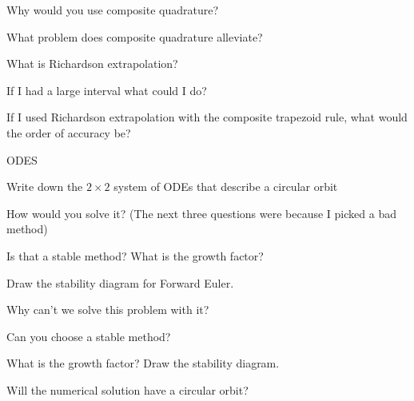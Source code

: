 \documentclass[12pt]{article}
\newenvironment{problem}[2][Problem]{\begin{trivlist}
\item[\hskip \labelsep {\bfseries #1}\hskip \labelsep {\bfseries #2.}]}{\end{trivlist}}
\begin{document}
\begin{problem}{}
Why would you use composite quadrature?
\end{problem}

\begin{problem}{}
What problem does composite quadrature alleviate?
\end{problem}

\begin{problem}{}
What is Richardson extrapolation?
\end{problem}

\begin{problem}{}
If I had a large interval what could I do?
\end{problem}


\begin{problem}{}
If I used Richardson extrapolation with the composite trapezoid rule, what would the order of accuracy be?
\end{problem}

ODES

\begin{problem}{}
Write down the $2\times 2$ system of ODEs that describe a circular orbit
\end{problem}

\begin{problem}{}
How would you solve it? (The next three questions were because I picked a bad method)
\end{problem}

\begin{problem}{}
Is that a stable method?  What is the growth factor?
\end{problem}

\begin{problem}{}
Draw the stability diagram for Forward Euler.
\end{problem}

\begin{problem}{}
Why can't we solve this problem with it?
\end{problem}

\begin{problem}{}
Can you choose a stable method?
\end{problem}

\begin{problem}{}
What is the growth factor?  Draw the stability diagram.
\end{problem}

\begin{problem}{}
Will the numerical solution have a circular orbit?
\end{problem}
\end{document}
